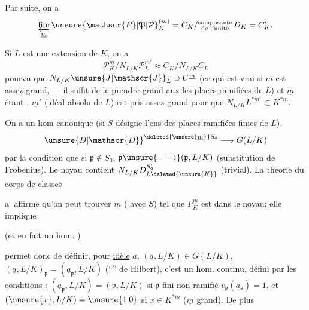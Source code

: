 Par suite, on a
\[
\varprojlim_{\underline m}{\unsure{\mathscr{P}|\mathfrak{P}|\mathcal{P}}}_K^{(m)}=C_K/\substack{\text{composante}\\\text{de l'unité}}\,D_K=C'_K.
\]

Si $L$ est une extension   de $K$, on a
\[
\mathscr{P}_K^{\underline m}/N_{L/K}\mathscr{P}_L^{\underline m'}\approx C_K/N_{L/K}C_L
\]
pourvu que $N_{L/K}{\unsure{J|\mathscr{J}}}_L\supset U^{\underline m}$ (ce qui est vrai si $\underline m$ est assez grand, --- il suffit de le prendre grand  aux  les places \uline{ramifiées} de $L$) et $\underline m$ étant , $\underline m'$ (idéal absolu de $L$) est pris assez grand pour que $N_{L/K}L^{*\underline m'}\subset K^{*\underline m}$.

 On a un hom canonique (si $S$ désigne l'ens des places  ramifiées finies de $L$).
\[
{\unsure{D|\mathscr{D}}}^{\deleted{\unsure{\underline m}}S_0}\longrightarrow G(L/K)
\]
par la condition que si $\mathfrak p\notin S_0$, $\mathfrak p\unsure{-|\mapsto}(\mathfrak p,L/K)$ (substitution de Frobenius). Le noyau contient  $N_{L/K}D_{L\deleted{\unsure{K}}}^{S'_0}$ (trivial). La théorie du corps de classes

\textcircled{a} affirme qu'on peut trouver $\underline m$ ( avec $S$) tel que  $P_K^{\underline m}$ est dans le noyau; elle implique

(et en fait un hom.
)

 permet donc de définir, pour  \uline{idèle} $\underline a$,  $(\underline a,L/K)\in G(L/K)$,  $(\underline a,L/K)_{\mathfrak p}=(\underline a_{\mathfrak p},L/K)$ (``'' de Hilbert), c'est un hom. continu, défini par les conditions : $(\underline a_{\mathfrak p},L/K)=(\mathfrak p,L/K)$ si $\mathfrak p$ fini non ramifié  $v_{\mathfrak p}(a_{\mathfrak p})=1$, et $(\unsure{x},L/K)=\unsure{1|0}$ si  $x\in K^{*\underline m}$ ($\underline m$ grand). De plus

